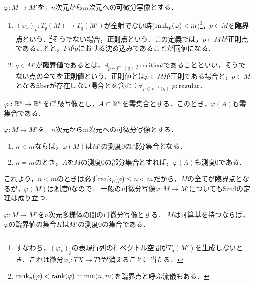 \documentclass[uplatex,dvipdfmx]{jsreport}
\begin{document}
\begin{definition}
    $\varphi:M\to M'$を，$n$次元から$m$次元への可微分写像とする．
    \begin{enumerate}
        \item $(\varphi_*)_p:T_p(M)\to T_q(M')$が全射でない時($\mathrm{rank}_p(\varphi)<m$)\footnote{すなわち，$(\varphi_*)_p$の表現行列の行ベクトル空間が$T_q(M')$を生成しないとき．これは微分$\varphi_*:TX\to TY$が消えることに当たる．}，$p\in M$を\textbf{臨界点}という．\footnote{$\mathrm{rank}_p(\varphi)<\mathrm{rank}(\varphi)=\min(n,m)$を臨界点と呼ぶ流儀もある．}そうでない場合，\textbf{正則点}という．この定義では，$p\in M$が正則点であることと，$F$が$p$における沈め込みであることが同値になる．
        \item $q\in M'$が\textbf{臨界値}であるとは，$\exists_{p\in f^{-1}(q)}\;p:\mathrm{critical}$であることといい，そうでない点の全てを\textbf{正則値}という．正則値とは$p\in M$が正則である場合と，$p\in M$となるfiberが存在しない場合とを含む：$\forall_{p\in F^{-1}(q)}\;p:\mathrm{regular}$．
    \end{enumerate}
\end{definition}

\begin{lemma}
    $\varphi:\mathbb{R}^n\to\mathbb{R}^n$を$C^1$級写像とし，$A\subset\mathbb{R}^n$を零集合とする．このとき，$\varphi(A)$も零集合である．
\end{lemma}

\begin{lemma}
    $\varphi:M\to M'$を，$n$次元から$m$次元への可微分写像とする．
    \begin{enumerate}
        \item $n<m$ならば，$\varphi(M)$は$M'$の測度$0$の部分集合となる．
        \item $n=m$のとき，$A$を$M$の測度$0$の部分集合とすれば，$\varphi(A)$も測度$0$である．
    \end{enumerate}
\end{lemma}
\begin{remark}
    これより，$n<m$のときは必ず$\mathrm{rank}_p(\varphi)\le n<m$だから，$M$の全てが臨界点となるが，$\varphi(M)$は測度$0$なので，
    一般の可微分写像$\varphi:M\to M'$についてもSardの定理は成り立つ．
\end{remark}

\begin{theorem}[Sard]
    $\varphi:M\to M'$を$n$次元多様体の間の可微分写像とする．
    $M$は可算基を持つならば，$\varphi$の臨界値の集合$K$は$M'$の測度$0$の集合である．
\end{theorem}
\end{document}
